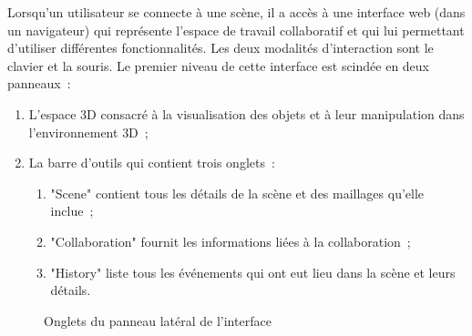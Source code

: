 %	
%	
%	
%	
%	
%	
%	
Lorsqu'un utilisateur se connecte à une scène, il a accès à une interface web 
(dans un navigateur) qui représente l'espace de travail collaboratif et qui lui 
permettant 
d'utiliser différentes fonctionnalités. Les deux modalités d'interaction sont le clavier 
et la souris. Le premier niveau de cette 
interface est scindée en deux panneaux~: 
\begin{enumerate}
	\item L'espace \gls{3D} consacré à la visualisation des objets et à leur 
	manipulation 
	dans l'environnement \gls{3D}~;
	\item La barre d'outils qui contient trois onglets~:~
	\begin{enumerate}
		\item "Scene" contient tous les détails de la scène et des maillages qu'elle 
		inclue~; 
		\item "Collaboration" fournit les informations liées à la collaboration~;
		\item "History" liste tous les événements qui ont eut lieu dans la scène et 
		leurs  détails. 
	\end{enumerate}
\end{enumerate}

\begin{figure}[h]
	\centering
	\begingroup
	
	\hfill
	\hfill
	
	\endgroup
	\caption{Onglets du panneau latéral de l'interface}
	\label{fig:uipanneau}
\end{figure}

